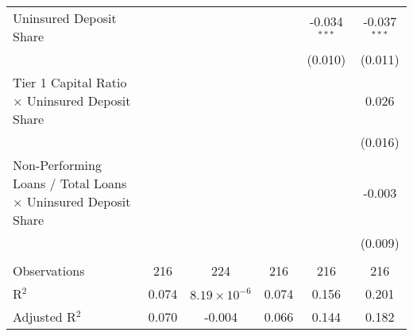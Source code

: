 \begin{table}[htbp]
\begin{adjustbox}{width = 1.2\textwidth, center}
\begin{tabular}{lccccc}
         Uninsured Deposit Share                                              &                &                       &                & -0.034$^{***}$ & -0.037$^{***}$\\   
                                                                              &                &                       &                & (0.010)        & (0.011)\\   
         Tier 1 Capital Ratio $\times$ Uninsured Deposit Share                &                &                       &                &                & 0.026\\   
                                                                              &                &                       &                &                & (0.016)\\   
         Non-Performing Loans / Total Loans $\times$ Uninsured Deposit Share  &                &                       &                &                & -0.003\\   
                                                                              &                &                       &                &                & (0.009)\\   
          \\
         Observations                                                         & 216            & 224                   & 216            & 216            & 216\\  
         R$^2$                                                                & 0.074          & $8.19\times 10^{-6}$  & 0.074          & 0.156          & 0.201\\  
         Adjusted R$^2$                                                       & 0.070          & -0.004                & 0.066          & 0.144          & 0.182\\  
         \bottomrule
      \end{tabular}
   \end{adjustbox}
\end{table}


